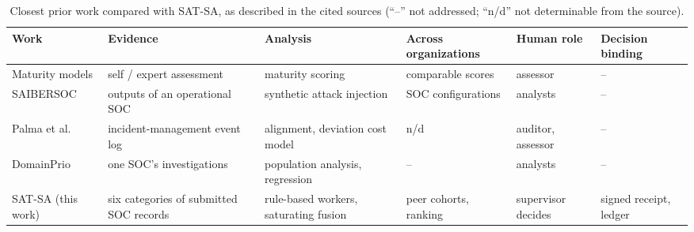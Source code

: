 \begin{table}[t]
\caption{Closest prior work compared with SAT-SA, as described in the cited sources
(``--'' not addressed; ``n/d'' not determinable from the source).}
\label{tab:related}
\centering
\scriptsize
\setlength{\tabcolsep}{2.5pt}
\begin{tabular}{@{}p{2.1cm}p{2.1cm}p{2.1cm}p{1.7cm}p{1.5cm}p{1.5cm}@{}}
\toprule
Work & Evidence & Analysis & Across organizations & Human role & Decision binding \\
\midrule
Maturity models \cite{vanos2016soccmm,schlette2021ctisoc2m2} & self / expert assessment & maturity scoring & comparable scores & assessor & -- \\
SAIBERSOC \cite{rosso2020saibersoc} & outputs of an operational SOC & synthetic attack injection & SOC configurations & analysts & -- \\
Palma et al.\ \cite{palma2024compliance,palma2025impavid} & incident-management event log & alignment, deviation cost model & n/d & auditor, assessor & -- \\
DomainPrio \cite{chiba2022domainprio} & one SOC's investigations & population analysis, regression & -- & analysts & -- \\
SAT-SA (this work) & six categories of submitted SOC records & rule-based workers, saturating fusion & peer cohorts, ranking & supervisor decides & signed receipt, ledger \\
\bottomrule
\end{tabular}
\end{table}
